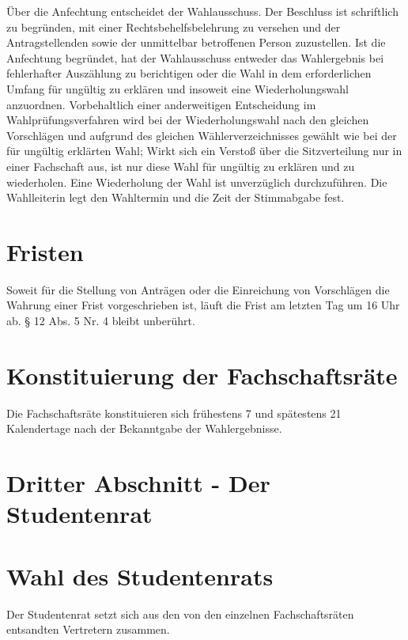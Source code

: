 \begin{multicols}{2}
\Abs \Satz Über die Anfechtung entscheidet der Wahlausschuss. Der Beschluss ist schriftlich zu begründen, mit einer Rechtsbehelfsbelehrung zu versehen und der Antragstellenden sowie der unmittelbar betroffenen Person zuzustellen. Ist die Anfechtung begründet, hat der Wahlausschuss entweder das Wahlergebnis bei fehlerhafter Auszählung zu berichtigen oder die Wahl in dem erforderlichen Umfang für ungültig zu erklären und insoweit eine Wiederholungswahl anzuordnen. Vorbehaltlich einer anderweitigen Entscheidung im Wahlprüfungsverfahren wird bei der Wiederholungswahl nach den gleichen Vorschlägen und aufgrund des gleichen Wählerverzeichnisses gewählt wie bei der für ungültig erklärten Wahl; Wirkt sich ein Verstoß über die Sitzverteilung nur in einer Fachschaft aus, ist nur diese Wahl für ungültig zu erklären und zu wiederholen. Eine Wiederholung der Wahl ist unverzüglich durchzuführen. Die Wahlleiterin legt den Wahltermin und die Zeit der Stimmabgabe fest.

\section{Fristen}
\Abs \Satz Soweit für die Stellung von Anträgen oder die Einreichung von Vorschlägen die Wahrung einer Frist vorgeschrieben ist, läuft die Frist am letzten Tag um 16 Uhr ab. § 12 Abs. 5 Nr. 4 bleibt unberührt.

\section{Konstituierung der Fachschaftsräte}
\Abs \Satz Die Fachschaftsräte konstituieren sich frühestens 7 und spätestens 21 Kalendertage nach der Bekanntgabe der Wahlergebnisse.

\section*{Dritter Abschnitt - Der Studentenrat}
\section{Wahl des Studentenrats}
\Abs \Satz Der Studentenrat setzt sich aus den von den einzelnen Fachschaftsräten entsandten Vertretern zusammen.


\end{multicols}
